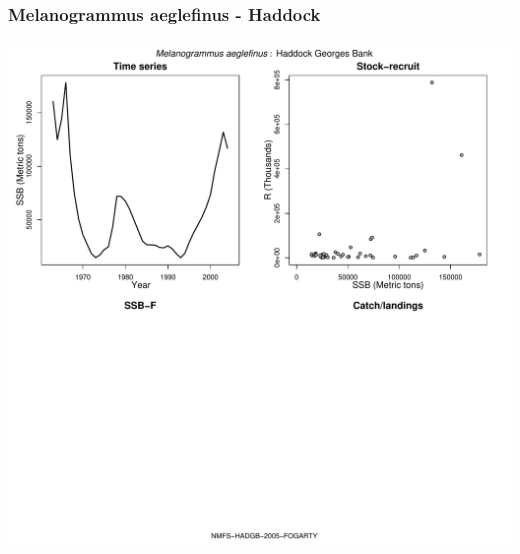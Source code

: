 \subsubsection{Melanogrammus aeglefinus - Haddock}
\begin{center}
\includegraphics[width=1.2\textwidth]{../R/figures/NMFS-HADGB-2005-FOGARTY.pdf}
\end{center}

